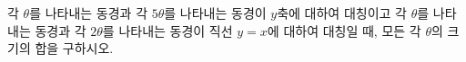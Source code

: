 각 $\theta$를 나타내는 동경과 각 $5\theta$를 나타내는 동경이 $y$축에 대하여 대칭이고 각 $\theta$를 나타내는 동경과 각 $2\theta$를 나타내는 동경이 직선 $y=x$에 대하여 대칭일 때, 모든 각 $\theta$의 크기의 합을 구하시오. 
